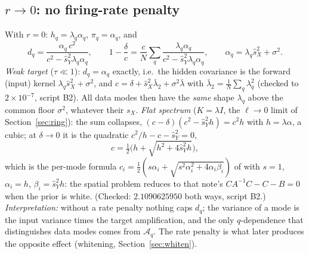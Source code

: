 \documentclass[11pt,a4paper]{article}
\newcommand{\sX}{\hat s_X^2}
\newcommand{\sY}{\hat s_Y^2}
\newcommand{\amp}{\mathcal A}
\theoremstyle{remark}
\begin{document}
\subsection{\texorpdfstring{$r\to0$}{r -> 0}: no firing-rate penalty}
\label{sec:r0}
With $r = 0$: $h_q = \lambda_q\alpha_q$, $\pi_q = \alpha_q$, and
\begin{equation}
  d_q = \frac{\alpha_q\,c^2}{c^2 - \sY\lambda_q\alpha_q},\qquad
  1 - \frac\delta c = \frac cN\sum_q\frac{\lambda_q\alpha_q}{c^2 - \sY\lambda_q\alpha_q},\qquad
  \alpha_q = \lambda_q\sX + \sigma^2 .
\end{equation}
\emph{Weak target} ($\tau\ll1$): $d_q = \alpha_q$ exactly, i.e.\ the hidden covariance is the forward (input) kernel $\lambda_q\sX + \sigma^2$, and $c = \delta + \sX\bar\lambda_2 + \sigma^2\bar\lambda$ with $\bar\lambda_2 = \frac1N\sum_q\lambda_q^2$ (checked to $2\times10^{-7}$, script B2). All data modes then have the \emph{same} shape $\lambda_q$ above the common floor $\sigma^2$, whatever their $s_X$.
\emph{Flat spectrum} ($K = \lambda I$, the $\ell\to0$ limit of Section~\ref{sec:ring}): the sum collapses, $(c-\delta)(c^2 - \sY h) = c^2h$ with $h = \lambda\alpha$, a cubic; at $\delta\to0$ it is the quadratic $c^2/h - c - \sY = 0$,
\begin{equation}
  c = \tfrac12\Big(h + \sqrt{h^2 + 4\sY h}\Big),
\end{equation}
which is the per-mode formula $c_i = \frac12(s\alpha_i + \sqrt{s^2\alpha_i^2 + 4\alpha_i\beta_i})$ of  with $s = 1$, $\alpha_i = h$, $\beta_i = \sY h$: the spatial problem reduces to that note's $CA^{-1}C - C - B = 0$ when the prior is white. (Checked: $2.1090625950$ both ways, script B2.)
\emph{Interpretation:} without a rate penalty nothing caps $d_q$; the variance of a mode is the input variance times the target amplification, and the only $q$-dependence that distinguishes data modes comes from $\amp_q$. The rate penalty is what later produces the opposite effect (whitening, Section~\ref{sec:whiten}).
\end{document}
